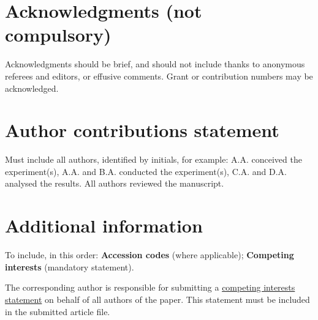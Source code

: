 \documentclass[fleqn,10pt]{wlscirep}
\begin{document}
\newpage
\section*{Acknowledgments (not compulsory)}

Acknowledgments should be brief, and should not include thanks to anonymous referees and editors, or effusive comments. Grant or contribution numbers may be acknowledged.

\section*{Author contributions statement}

Must include all authors, identified by initials, for example:
A.A. conceived the experiment(s),  A.A. and B.A. conducted the experiment(s), C.A. and D.A. analysed the results.  All authors reviewed the manuscript. 

\section*{Additional information}

To include, in this order: \textbf{Accession codes} (where applicable); \textbf{Competing interests} (mandatory statement). 

The corresponding author is responsible for submitting a \href{http://www.nature.com/srep/policies/index.html#competing}{competing interests statement} on behalf of all authors of the paper. This statement must be included in the submitted article file.

\newpage
\appendix



\end{document}
